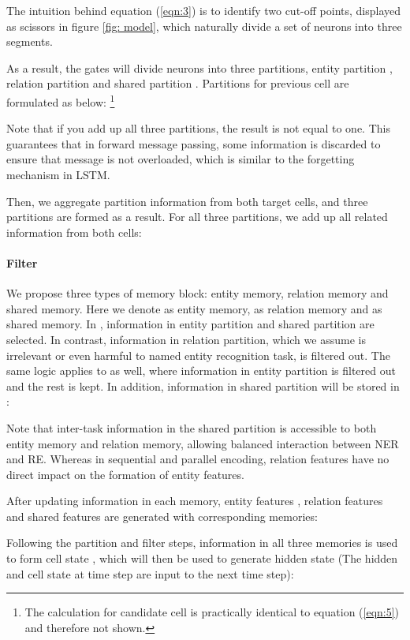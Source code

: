 \documentclass[11pt]{article}
\begin{document}
The intuition behind equation (\ref{eqn:3}) is to identify two cut-off points, displayed as scissors in figure \ref{fig: model}, which naturally divide a set of neurons into three segments.

As a result, the gates will divide neurons into three partitions, entity partition , relation partition  and shared partition . Partitions for previous cell  are formulated as below:  \footnote{The calculation for candidate cell  is practically identical to equation (\ref{eqn:5}) and therefore not shown.}

Note that if you add up all three partitions, the result is not equal to one. This guarantees that in forward message passing, some information is discarded to ensure that message is not overloaded, which is similar to the forgetting mechanism in LSTM. 

Then, we aggregate partition information from both target cells, and three partitions are formed as a result. For all three partitions, we add up all related information from both cells:

\paragraph{Filter} We propose three types of memory block: entity memory, relation memory and shared memory. Here we denote  as entity memory,  as relation memory and  as shared memory. In , information in entity partition and shared partition are selected. In contrast, information in relation partition, which we assume is irrelevant or even harmful to named entity recognition task, is filtered out. The same logic applies to  as well, where information in entity partition is filtered out and the rest is kept. In addition, information in shared partition will be stored in :

Note that inter-task information in the shared partition is accessible to both entity memory and relation memory, allowing balanced interaction between NER and RE. Whereas in sequential and parallel encoding, relation features have no direct impact on the formation of entity features.

After updating information in each memory, entity features , relation features  and shared features  are generated with corresponding memories:

Following the partition and filter steps, information in all three memories is used to form cell state ,  which will then be used to generate hidden state  (The hidden and cell state at time step  are input to the next time step):
\end{document}
